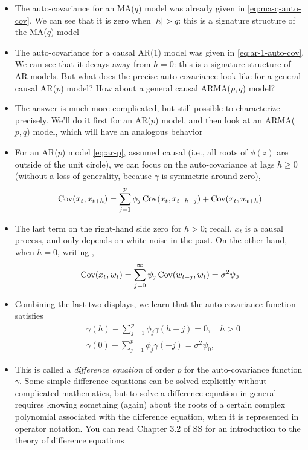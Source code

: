 \documentclass{article}
\begin{document}
\begin{itemize}
\item The auto-covariance for an MA($q$) model was already given in
  \eqref{eq:ma-q-auto-cov}. We can see that it is zero when $|h| > q$: this is a
  signature structure of the MA($q$) model 

\item The auto-covariance for a causal AR(1) model was given in
  \eqref{eq:ar-1-auto-cov}. We can see that it decays away from $h=0$: this is 
  a signature structure of AR models. But what does the precise auto-covariance
  look like for a general causal AR($p$) model? How about a general causal
  ARMA($p,q$) model?  

\item The answer is much more complicated, but still possible to characterize
  precisely. We'll do it first for an AR($p$) model, and then look at an
  ARMA($p,q$) model, which will have an analogous behavior 

\item For an AR($p$) model \eqref{eq:ar-p}, assumed causal (i.e., all roots of
  $\phi(z)$ are outside of the unit circle), we can focus on the auto-covariance  
  at lags $ h \geq 0$ (without a loss of generality, because $\gamma$ is
  symmetric around zero), 
  \[
  \operatorname{Cov}(x_t, x_{t+h}) = \sum_{j=1}^p \phi_j \operatorname{Cov}(x_t, x_{t+h-j}) + \operatorname{Cov}(x_t,
  w_{t+h})  
  \]

\item The last term on the right-hand side zero for $h>0$; recall, $x_t$ is a  
  causal process, and only depends on white noise in the past. On the other
  hand, when $h=0$, writing , 
  \[
  \operatorname{Cov}(x_t, w_t) = \sum_{j=0}^\infty \psi_j \operatorname{Cov}(w_{t-j}, w_t) =  \sigma^2
  \psi_0   
  \]

\item Combining the last two displays, we learn that the auto-covariance
  function satisfies 
  \begin{align*}
  &\gamma(h) - \sum_{j=1}^p \phi_j \gamma(h-j) = 0, \quad h > 0 \\ 
  &\gamma(0) - \sum_{j=1}^p \phi_j \gamma(-j) = \sigma^2 \psi_0, 
  \end{align*}

\item This is called a \emph{difference equation} of order $p$ for the
  auto-covariance function $\gamma$. Some simple difference equations can be
  solved explicitly without complicated mathematics, but to solve a difference  
  equation in general requires knowing something (again) about the roots of a
  certain complex polynomial associated with the difference equation, when it is
  represented in operator notation. You can read Chapter 3.2 of SS for an
  introduction to the theory of difference equations


\end{itemize}
\end{document}
